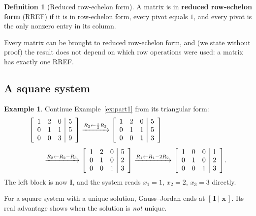 \documentclass[11pt]{article}
\theoremstyle{plain}
\theoremstyle{definition}
\newtheorem{defn}{Definition}[section]
\newtheorem{ex}{Example}[section]
\theoremstyle{remark}
\newcommand{\vc}[1]{\mathbf{#1}}
\newcommand{\mt}[1]{\mathbf{#1}}
\newenvironment{aug}[1]{\left[\begin{array}{#1}}{\end{array}\right]}
\begin{document}
\begin{defn}[Reduced row-echelon form]
A matrix is in \textbf{reduced row-echelon form} (RREF) if it is in row-echelon
form, every pivot equals $1$, and every pivot is the only nonzero entry in its
column.
\end{defn}

\noindent Every matrix can be brought to reduced row-echelon form, and (we state
without proof) the result does not depend on which row operations were used: a
matrix has exactly one RREF.

\subsection{A square system}
\begin{ex}
Continue Example~\ref{ex:part1} from its triangular form:
\[
  \begin{aligned}
  &\begin{aug}{ccc|c}1&2&0&5\\0&1&1&5\\0&0&3&9\end{aug}
  \xrightarrow{R_3\gets\frac13R_3}
  \begin{aug}{ccc|c}1&2&0&5\\0&1&1&5\\0&0&1&3\end{aug}\\[4pt]
  &\qquad\xrightarrow{R_2\gets R_2-R_3}
  \begin{aug}{ccc|c}1&2&0&5\\0&1&0&2\\0&0&1&3\end{aug}
  \xrightarrow{R_1\gets R_1-2R_2}
  \begin{aug}{ccc|c}1&0&0&1\\0&1&0&2\\0&0&1&3\end{aug}.
  \end{aligned}
\]
The left block is now $\mt{I}$, and the system reads $x_1=1$, $x_2=2$, $x_3=3$
directly.
\end{ex}

\noindent For a square system with a unique solution, Gauss--Jordan ends at
$[\,\mt{I}\mid\vc{x}\,]$. Its real advantage shows when the solution is
\emph{not} unique.

\end{document}
